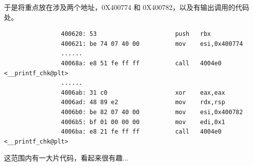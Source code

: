 \documentclass{ctexbeamer}
\begin{document}
    \begin{frame}[fragile]
    
        于是将重点放在涉及两个地址，0X400774 和 0X400782，以及有输出调用的代码处。\pause

        {
            \small
            \begin{verbatim}
                400620:	53                   	push   rbx
                400621:	be 74 07 40 00       	mov    esi,0x400774
                ......
                40068a:	e8 51 fe ff ff       	call   4004e0 <__printf_chk@plt>
                ......
                4006ab:	31 c0                	xor    eax,eax
                4006ad:	48 89 e2             	mov    rdx,rsp
                4006b0:	be 82 07 40 00       	mov    esi,0x400782
                4006b5:	bf 01 00 00 00       	mov    edi,0x1
                4006ba:	e8 21 fe ff ff       	call   4004e0 <__printf_chk@plt>
            \end{verbatim}
            \pause
        }

        这范围内有一大片代码，看起来很有趣...
    
    \end{frame}
\end{document}
